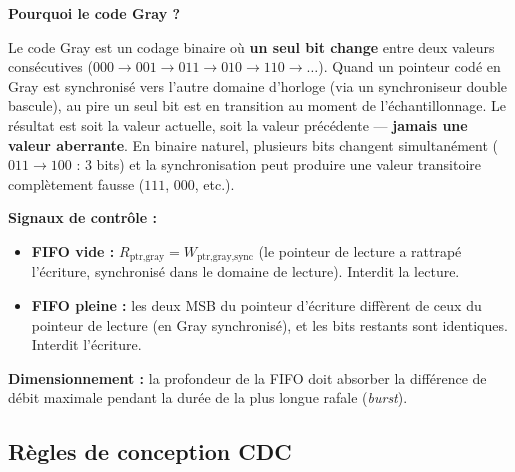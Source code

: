 \documentclass[12pt,a4paper,twoside]{book}
\begin{document}
\begin{intuition}
\textbf{Pourquoi le code Gray ?}

Le code Gray est un codage binaire où \textbf{un seul bit change} entre deux valeurs consécutives ($000 \to 001 \to 011 \to 010 \to 110 \to \ldots$). Quand un pointeur codé en Gray est synchronisé vers l'autre domaine d'horloge (via un synchroniseur double bascule), au pire un seul bit est en transition au moment de l'échantillonnage. Le résultat est soit la valeur actuelle, soit la valeur précédente --- \textbf{jamais une valeur aberrante}. En binaire naturel, plusieurs bits changent simultanément ($011 \to 100$ : 3 bits) et la synchronisation peut produire une valeur transitoire complètement fausse ($111$, $000$, etc.).
\end{intuition}

\begin{formule}
\textbf{Signaux de contrôle :}
\begin{itemize}[nosep]
\item \textbf{FIFO vide :} $R_{\text{ptr,gray}} = W_{\text{ptr,gray,sync}}$ (le pointeur de lecture a rattrapé l'écriture, synchronisé dans le domaine de lecture). Interdit la lecture.
\item \textbf{FIFO pleine :} les deux MSB du pointeur d'écriture diffèrent de ceux du pointeur de lecture (en Gray synchronisé), et les bits restants sont identiques. Interdit l'écriture.
\end{itemize}

\textbf{Dimensionnement :} la profondeur de la FIFO doit absorber la différence de débit maximale pendant la durée de la plus longue rafale (\textit{burst}).
\end{formule}

\subsection{Règles de conception CDC}
\end{document}
